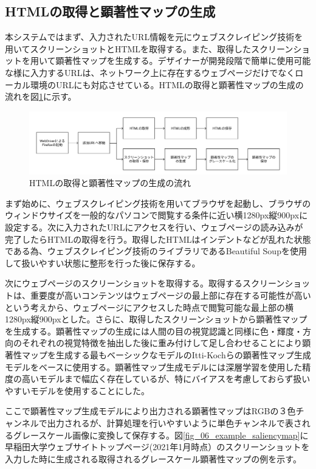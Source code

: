 \subsection{HTMLの取得と顕著性マップの生成}\label{subsec:system01}
\par 本システムではまず、入力されたURL情報を元にウェブスクレイピング技術を用いてスクリーンショットとHTMLを取得する。また、取得したスクリーンショットを用いて顕著性マップを生成する。デザイナーが開発段階で簡単に使用可能な様に入力するURLは、ネットワーク上に存在するウェブページだけでなくローカル環境のURLにも対応させている。HTMLの取得と顕著性マップの生成の流れを図\ref{fig_system01}に示す。

\begin{figure}[H]
    \centering
    \includegraphics[width=12cm]{figures/06_process01.jpg}
    \caption{HTMLの取得と顕著性マップの生成の流れ}
    \label{fig_system01}
\end{figure}

\par まず始めに、ウェブスクレイピング技術を用いてブラウザを起動し、ブラウザのウィンドウサイズを一般的なパソコンで閲覧する条件に近い横1280px縦900pxに設定する。次に入力されたURLにアクセスを行い、ウェブページの読み込みが完了したらHTMLの取得を行う。取得したHTMLはインデントなどが乱れた状態である為、ウェブスクレイピング技術のライブラリであるBeautiful Soup\cite{beautifulsoup}を使用して扱いやすい状態に整形を行った後に保存する。

\par 次にウェブページのスクリーンショットを取得する。取得するスクリーンショットは、重要度が高いコンテンツはウェブページの最上部に存在する可能性が高いという考えから、ウェブページにアクセスした時点で閲覧可能な最上部の横1280px縦900pxとした。さらに、取得したスクリーンショットから顕著性マップを生成する。顕著性マップの生成には人間の目の視覚認識と同様に色・輝度・方向のそれぞれの視覚特徴を抽出した後に重み付けして足し合わせることにより顕著性マップを生成する最もベーシックなモデルのItti-Kochらの顕著性マップ生成モデル\cite{itti1998model}をベースに使用する。顕著性マップ生成モデルには深層学習を使用した精度の高いモデルまで幅広く存在しているが、特にバイアスを考慮しておらず扱いやすいモデルを使用することにした。
\par ここで顕著性マップ生成モデルにより出力される顕著性マップはRGBの３色チャンネルで出力されるが、計算処理を行いやすいように単色チャンネルで表されるグレースケール画像に変換して保存する。図\ref{fig_06_example_saliencymap}に早稲田大学ウェブサイトトップページ(2021年1月時点）\cite{waseda_top}のスクリーンショットを入力した時に生成される取得されるグレースケール顕著性マップの例を示す。


